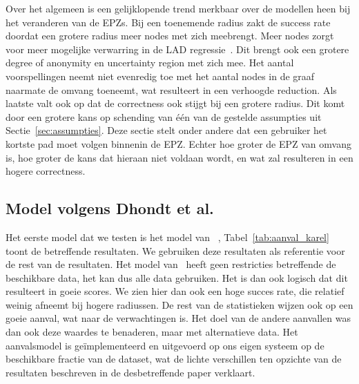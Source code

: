 Over het algemeen is een gelijklopende trend merkbaar over de modellen heen bij
het veranderen van de \acp{EPZ}. Bij een toenemende radius zakt de success rate
doordat een grotere radius meer nodes met zich meebrengt. Meer nodes zorgt voor
meer mogelijke verwarring in de \ac{LAD} regressie~\cite{Verdonck_2022}. Dit
brengt ook een grotere degree of anonymity en uncertainty region met zich mee.
Het aantal voorspellingen neemt niet evenredig toe met het aantal nodes in de
graaf naarmate de omvang toeneemt, wat resulteert in een verhoogde reduction.
Als laatste valt ook op dat de correctness ook stijgt bij een grotere radius.
Dit komt door een grotere kans op schending van één van de gestelde assumpties
uit Sectie~\ref{sec:assumpties}. Deze sectie stelt onder andere dat een
gebruiker het kortste pad moet volgen binnenin de \ac{EPZ}. Echter hoe groter
de \ac{EPZ} van omvang is, hoe groter de kans dat hieraan niet voldaan wordt,
en wat zal resulteren in een hogere correctness.

\subsection{Model volgens Dhondt et al.}
Het eerste model dat we testen is het model van
\citeauthor{Dhondt}~\cite{Dhondt}, Tabel~\ref{tab:aanval_karel} toont de
betreffende resultaten. We gebruiken deze resultaten als referentie voor de
rest van de resultaten. Het model van~\citeauthor{Dhondt} heeft geen
restricties betreffende de beschikbare data, het kan dus alle data gebruiken.
Het is dan ook logisch dat dit resulteert in goeie scores. We zien hier dan ook
een hoge succes rate, die relatief weinig afneemt bij hogere radiussen. De rest
van de statistieken wijzen ook op een goeie aanval, wat naar de verwachtingen
is. Het doel van de andere aanvallen was dan ook deze waardes te benaderen,
maar met alternatieve data. Het aanvalsmodel is geïmplementeerd en uitgevoerd
op ons eigen systeem op de beschikbare fractie van de dataset, wat de lichte
verschillen ten opzichte van de resultaten beschreven in de desbetreffende
paper verklaart.

